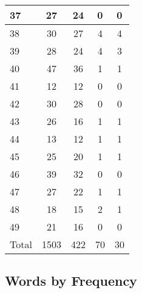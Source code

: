 \begin{center}
\begin{longtable}{l|c|c|c|c}
37 & 27 & 24 & 0 & 0\\ \hline
38 & 30 & 27 & 4 & 4\\ \hline
39 & 28 & 24 & 4 & 3\\ \hline
40 & 47 & 36 & 1 & 1\\ \hline
41 & 12 & 12 & 0 & 0\\ \hline
42 & 30 & 28 & 0 & 0\\ \hline
43 & 26 & 16 & 1 & 1\\ \hline
44 & 13 & 12 & 1 & 1\\ \hline
45 & 25 & 20 & 1 & 1\\ \hline
46 & 39 & 32 & 0 & 0\\ \hline
47 & 27 & 22 & 1 & 1\\ \hline
48 & 18 & 15 & 2 & 1\\ \hline
49 & 21 & 16 & 0 & 0\\ \hline
\hline \hline
Total & 1503 & 422 & 70 & 30



\end{longtable}
\end{center}

 
\subsection{Words by Frequency}

